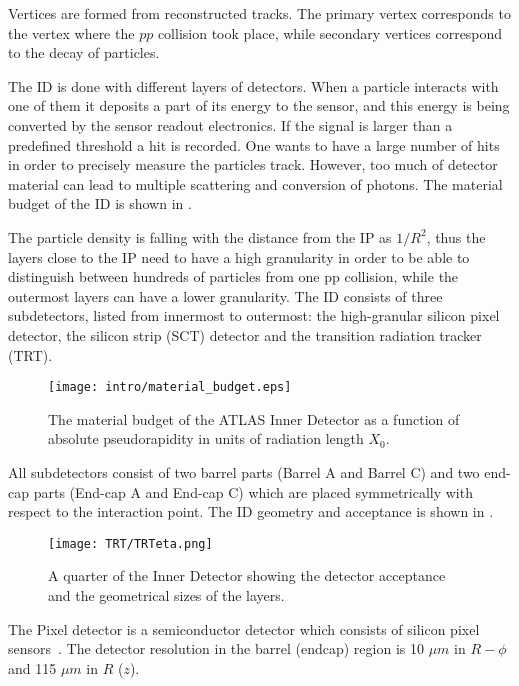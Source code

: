 Vertices are formed from reconstructed tracks. The primary vertex corresponds to the vertex where the $pp$ collision took place, 
while secondary vertices correspond to the decay of particles.

The ID is done with different layers of detectors. When a particle interacts with one of them it deposits a part of its energy to the sensor,
and this energy is being converted by the sensor readout electronics. 
If the signal is larger than a predefined threshold a hit is recorded.
One wants to have a large number of hits in order to precisely measure the particles track.  
However, too much of detector material can lead to multiple scattering and conversion of photons.
The material  budget of the ID is shown in .

The particle density is falling with the distance from the IP as $1/R^2$, 
thus the layers close to the IP need to have a high granularity in order to be able to distinguish between
hundreds of particles from one pp collision, while the outermost layers can have a lower granularity.
The ID consists of three subdetectors, listed from innermost to outermost: the high-granular silicon pixel detector, the silicon strip (SCT) detector and the transition radiation tracker (TRT).


\begin{figure}
\centering
\texttt{[image: intro/material\_budget.eps]}
\caption{ 
The material budget of the ATLAS Inner Detector as a function of absolute pseudorapidity in units of radiation length $X_0$.
}
\label{fig:material_budget}
\end{figure}




All subdetectors consist of two barrel parts (Barrel A and Barrel C) and two end-cap parts (End-cap A and End-cap C) 
which are placed symmetrically with respect to the interaction point.
The ID geometry and acceptance is shown in .

\begin{figure}
\centering
\texttt{[image: TRT/TRTeta.png]}
\caption{ 
A quarter of the Inner Detector showing the detector acceptance and the geometrical sizes of the layers.
}
\label{fig:ID_eta}
\end{figure}


The Pixel detector is a semiconductor detector which consists of silicon pixel sensors~\cite{Wermes:381263}.
The detector resolution in the barrel (endcap) region is 10 $\mu m$ in $R-\phi$ and 115 $\mu m$ in $R$ ($z$).

